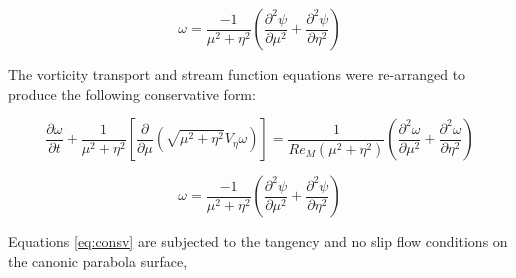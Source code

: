 \documentclass{article}
\newcommand{\pd}{\partial}
\begin{document}
\begin{equation}
\omega = \frac{-1}{\mu^2 + \eta^2} \left(\frac{\pd^2 \psi}{\pd \mu^2} + \frac{\pd^2 \psi}{\pd \eta^2} \right)
\end{equation}

The vorticity transport and stream function equations were re-arranged to produce the following conservative form:

\[
\frac{\pd \omega}{\pd t} + \frac{1}{\mu^2 + \eta^2} \left[\frac{\pd}{\pd \mu} \left(\sqrt{\mu^2 + \eta^2} V_\eta \omega \right) \right] = \frac{1}{Re_M(\mu^2 + \eta^2)} \left(\frac{\pd^2 \omega}{\pd \mu^2} + \frac{\pd^2 \omega}{\pd \eta^2} \right)
\]

\begin{equation}
\omega = \frac{-1}{\mu^2 + \eta^2} \left(\frac{\pd^2 \psi}{\pd \mu^2} + \frac{\pd^2 \psi}{\pd \eta^2} \right)
\label{eq:consv}
\end{equation}

Equations \ref{eq:consv} are subjected to the tangency and no slip flow conditions on the canonic parabola surface,
\end{document}
